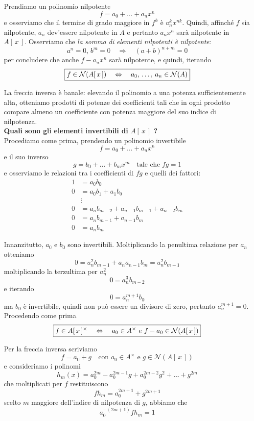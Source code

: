 \begin{multicols}{2}
Prendiamo un polinomio nilpotente 
\[ f = a_0 + \dots + a_nx^n \]
e osserviamo che il termine di grado maggiore in $ f^k $ è $ a_n^kx^{nk} $. Quindi, affinché $ f $ sia nilpotente, $ a_n $ dev'essere nilpotente in $ A $ e pertanto $ a_nx^n $ sarà nilpotente in $ A[\, x\,] $. Osserviamo che \emph{la somma di elementi nilpotenti è nilpotente}:
\[ a^n = 0,\, b^m = 0 \quad\Rightarrow\quad (a+b)^{n+m} = 0 \]
per concludere che anche $ f-a_nx^n $ sarà nilpotente, e quindi, iterando
\[ \boxed{f \in \mathcal{N}(A[\,x\,]) \quad\Leftrightarrow\quad a_0, \,\dots,\, a_n \in \mathcal{N}(A)}  \]

La freccia inversa è banale: elevando il polinomio a una potenza sufficientemente alta, otteniamo prodotti di potenze dei coefficienti tali che in ogni prodotto compare almeno un coefficiente con potenza maggiore del suo indice di nilpotenza. \\

\textbf{Quali sono gli elementi invertibili di $ A[\,x\,] $ ?} \\

Procediamo come prima, prendendo un polinomio invertibile
\[ f = a_0 + \dots + a_nx^n \]
e il suo inverso
\[ g = b_0 + \dots + b_mx^m \quad \text{tale che } fg = 1 \]
e osserviamo le relazioni tra i coefficienti di $ fg $ e quelli dei fattori:
\begin{align*}
	1 & = a_0 b_0 \\
	0 & = a_0 b_1 + a_1b_0 \\
	&  \vdots \\
	0 & = a_nb_{m-2} + a_{n-1}b_{m-1}+ a_{n-2}{b_m}\\
	0 & = a_nb_{m-1} + a_{n-1}b_m \\
	0 & = a_nb_m
\end{align*}

Innanzitutto, $ a_0 $ e $ b_0 $ sono invertibili. Moltiplicando la penultima relazione per $ a_n $ otteniamo
\[ 0 = a_n^2b_{m-1} + a_{n}a_{n-1}b_m = a_n^2b_{m-1} \]
moltiplicando la terzultima per $ a_n^2 $
\[ 0 = a_n^3b_{m-2} \]
e iterando
\[ 0 = a_n^{m+1}b_0 \]
ma $ b_0 $ è invertibile, quindi non può essere un divisore di zero, pertanto $ a_n^{m+1} = 0 $. Procedendo come prima
\[ \boxed{f \in A[\,x\,]^\times \quad\Leftrightarrow\quad a_0 \in A^\times \text{ e } f-a_0 \in \mathcal{N}(A[\,x\,])} \]

Per la freccia inversa scriviamo 
\[ f = a_0 + g \quad \text{con } a_0 \in A^\times \text{ e } g \in \mathcal{N}(A[\,x\,])  \]
e consideriamo i polinomi
\[ h_m(x) = a_0^{2m} - a_0^{2m-1}g + a_0^{2m-2}g^2 + \dots + g^{2m}  \]
che moltiplicati per $ f $ restituiscono
\[ fh_m = a_0^{2m+1} + g^{2m+1}  \]
scelto $ m $ maggiore dell'indice di nilpotenza di $ g $, abbiamo che $$  a_0^{-(2m+1)}f h_{m} = 1  $$


\end{multicols}
